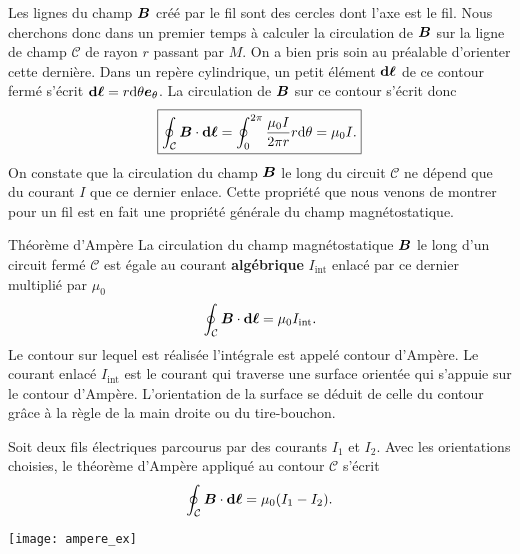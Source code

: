 Les lignes du champ $\vecb$ créé par le fil sont des cercles dont l'axe est le
fil. Nous cherchons donc dans un premier temps à calculer la circulation de $\vecb$ 
sur la ligne de champ $\mathcal{C}$ de rayon $r$ passant par $M$. 
On a bien pris soin au préalable
d'orienter cette dernière. Dans un repère cylindrique, un petit élément $\dl$ de ce 
contour fermé s'écrit $\dl = r \dtheta \etheta$. La circulation de $\vecb$ sur
ce contour s'écrit donc
\begin{equation*}
	\boxed{\displaystyle{\oint_\mathcal{C} \vecb \cdot \dl = 
		\oint_0^{2 \pi} \dfrac{\mu_0 I}{2 \pi r} r\dtheta
	= \mu_0 I.}}
\end{equation*}
On constate que la circulation du champ $\vecb$ le long du circuit $\mathcal{C}$
ne dépend que du courant $I$ que ce dernier enlace. Cette propriété que nous venons
de montrer pour un fil est en fait une propriété générale du champ magnétostatique.

\begin{defn}{Théorème d'Ampère}
	La circulation du champ magnétostatique $\vecb$ le long d'un circuit fermé
	$\mathcal{C}$ est égale au courant \textbf{algébrique} $I_\mathrm{int}$ 
	enlacé par ce dernier multiplié
	par $\mu_0$
	\begin{equation}
		\oint_\mathcal{C} \vecb \cdot \dl = \mu_0 I_\mathrm{int}.
	\end{equation}
	Le contour sur lequel est réalisée l'intégrale est appelé contour d'Ampère.
	Le courant enlacé $I_\mathrm{int}$ est le courant qui traverse une surface 
	orientée
	qui s'appuie sur le contour d'Ampère. L'orientation de la surface 
	se déduit de celle du contour
	grâce à la règle de la main droite ou du tire-bouchon.
\end{defn}

\begin{exemple}
	\begin{minipage}{0.6\linewidth}
	Soit deux fils électriques parcourus par des courants $I_1$ et $I_2$.
	Avec les orientations choisies, le théorème d'Ampère appliqué au 
	contour $\mathcal{C}$ s'écrit
	\begin{equation*}
		\oint_\mathcal{C} \vecb \cdot \dl = \mu_0(I_1 - I_2).
	\end{equation*}
	\end{minipage}
	\hfill
	\begin{minipage}{0.35\linewidth}
		\texttt{[image: ampere\_ex]}
	\end{minipage}

\end{exemple}

